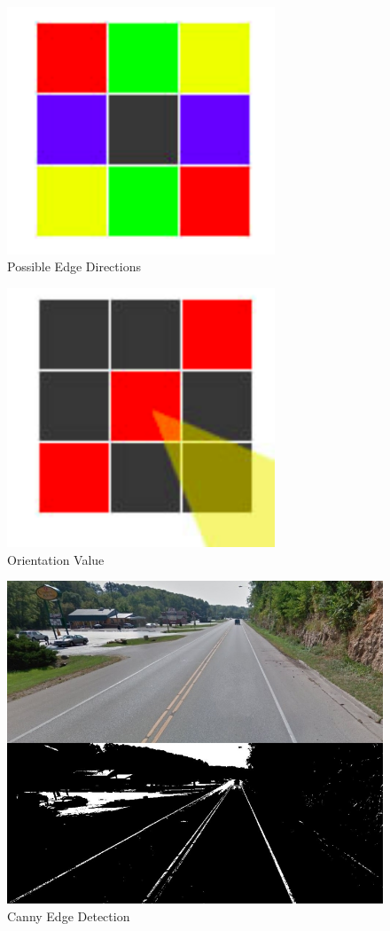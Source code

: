 \documentclass[12pt]{report}
\begin{document}
\newpage
\vspace{0.5cm}
\begin{figure}[h]
	\centering
	\includegraphics[width=8cm]{directions}
	\caption{Possible Edge Directions}
	\label{fig:directions}
\end{figure}

\newpage
\vspace{0.5cm}
\begin{figure}[h]
	\centering
	\includegraphics[width=8cm]{orientation}
	\caption{Orientation Value}
	\label{fig:orientation}
\end{figure}

\vspace{0.5cm}
\begin{figure}[h]
	\centering
	\includegraphics[width=12cm]{canny}
	\caption{Canny Edge Detection}
	\label{fig:canny}
\end{figure}
\end{document}
